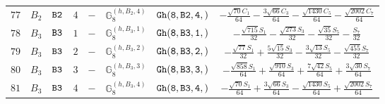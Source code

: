 \documentclass[fleqn,8pt]{jsarticle}
\begin{document}
\begin{table}[ht!]
\begin{center}
\begin{tabular}{cccccccc}
$ 77 $ & $ B_{2} $ & $ {\tt B2} $ & $ 4 $ & $ - $ & $ \mathbb{G}_{8}^{(h,B_{2},4)} $ & $ {\tt Gh(8,B2,4,)} $ & $ - \frac{\sqrt{70} C_{1}}{64} - \frac{3 \sqrt{66} C_{3}}{64} - \frac{\sqrt{1430} C_{5}}{64} - \frac{\sqrt{2002} C_{7}}{64} $ \\
$ 78 $ & $ B_{3} $ & $ {\tt B3} $ & $ 1 $ & $ - $ & $ \mathbb{G}_{8}^{(h,B_{3},1)} $ & $ {\tt Gh(8,B3,1,)} $ & $ - \frac{\sqrt{715} S_{1}}{32} - \frac{\sqrt{273} S_{3}}{32} - \frac{\sqrt{35} S_{5}}{32} - \frac{S_{7}}{32} $ \\
$ 79 $ & $ B_{3} $ & $ {\tt B3} $ & $ 2 $ & $ - $ & $ \mathbb{G}_{8}^{(h,B_{3},2)} $ & $ {\tt Gh(8,B3,2,)} $ & $ - \frac{\sqrt{77} S_{1}}{32} + \frac{5 \sqrt{15} S_{3}}{32} - \frac{3 \sqrt{13} S_{5}}{32} - \frac{\sqrt{455} S_{7}}{32} $ \\
$ 80 $ & $ B_{3} $ & $ {\tt B3} $ & $ 3 $ & $ - $ & $ \mathbb{G}_{8}^{(h,B_{3},3)} $ & $ {\tt Gh(8,B3,3,)} $ & $ - \frac{\sqrt{858} S_{1}}{64} + \frac{\sqrt{910} S_{3}}{64} + \frac{7 \sqrt{42} S_{5}}{64} + \frac{3 \sqrt{30} S_{7}}{64} $ \\
$ 81 $ & $ B_{3} $ & $ {\tt B3} $ & $ 4 $ & $ - $ & $ \mathbb{G}_{8}^{(h,B_{3},4)} $ & $ {\tt Gh(8,B3,4,)} $ & $ - \frac{\sqrt{70} S_{1}}{64} + \frac{3 \sqrt{66} S_{3}}{64} - \frac{\sqrt{1430} S_{5}}{64} + \frac{\sqrt{2002} S_{7}}{64} $ \\
 \hline \hline
\end{tabular}
\end{center}
\end{table}
\end{document}
